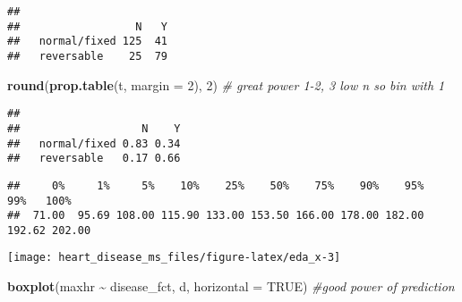 \documentclass[
]{article}
\newenvironment{Shaded}{\begin{snugshade}}{\end{snugshade}}
\newcommand{\AttributeTok}[1]{\textcolor[rgb]{0.13,0.29,0.53}{#1}}
\newcommand{\CommentTok}[1]{\textcolor[rgb]{0.56,0.35,0.01}{\textit{#1}}}
\newcommand{\ConstantTok}[1]{\textcolor[rgb]{0.56,0.35,0.01}{#1}}
\newcommand{\DecValTok}[1]{\textcolor[rgb]{0.00,0.00,0.81}{#1}}
\newcommand{\FunctionTok}[1]{\textcolor[rgb]{0.13,0.29,0.53}{\textbf{#1}}}
\newcommand{\NormalTok}[1]{#1}
\newcommand{\SpecialCharTok}[1]{\textcolor[rgb]{0.81,0.36,0.00}{\textbf{#1}}}
\begin{document}
\begin{verbatim}
##               
##                  N   Y
##   normal/fixed 125  41
##   reversable    25  79
\end{verbatim}

\begin{Shaded}
\begin{Highlighting}[]
\FunctionTok{round}\NormalTok{(}\FunctionTok{prop.table}\NormalTok{(t, }\AttributeTok{margin =} \DecValTok{2}\NormalTok{), }\DecValTok{2}\NormalTok{) }\CommentTok{\# great power 1{-}2, 3 low n so bin with 1}
\end{Highlighting}
\end{Shaded}

\begin{verbatim}
##               
##                   N    Y
##   normal/fixed 0.83 0.34
##   reversable   0.17 0.66
\end{verbatim}

\begin{Shaded}
\end{Shaded}

\begin{verbatim}
##     0%     1%     5%    10%    25%    50%    75%    90%    95%    99%   100% 
##  71.00  95.69 108.00 115.90 133.00 153.50 166.00 178.00 182.00 192.62 202.00
\end{verbatim}

\begin{Shaded}
\end{Shaded}

\begin{center}\texttt{[image: heart\_disease\_ms\_files/figure-latex/eda\_x-3]} \end{center}

\begin{Shaded}
\begin{Highlighting}[]
\FunctionTok{boxplot}\NormalTok{(maxhr }\SpecialCharTok{\textasciitilde{}}\NormalTok{ disease\_fct, d, }\AttributeTok{horizontal =} \ConstantTok{TRUE}\NormalTok{) }\CommentTok{\#good power of prediction }
\end{Highlighting}
\end{Shaded}
\end{document}
